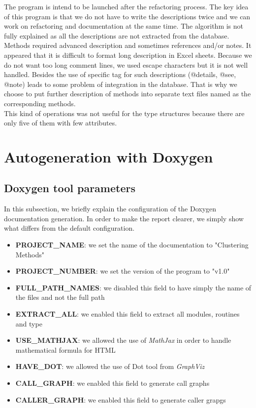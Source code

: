 The program is intend to be launched after the refactoring process. The key idea of this program is that we do not have to write the descriptions twice and we can work on refactoring and documentation at the same time. The algorithm is not fully explained as all the descriptions are not extracted from the database. Methods required advanced description and sometimes references and/or notes. It appeared that it is difficult to format long description in Excel sheets. Because we do not want too long comment lines, we used escape characters but it is not well handled.  Besides the use of specific tag for such descriptions (@details, @see, @note) leads to some problem of integration in the database. That is why we choose to put further description of methods into separate text files named as the corresponding methods.\\

This kind of operations was not useful for the type structures because there are only five of them with few attributes.
\section{Autogeneration with Doxygen}
\subsection{Doxygen tool parameters}
In this subsection, we briefly explain the configuration of the Doxygen documentation generation. In order to make the report clearer, we simply show what differs from the default configuration.
\begin{itemize}
\item \textbf{PROJECT\_NAME}: we set the name of the documentation to "Clustering Methods"
\item \textbf{PROJECT\_NUMBER}: we set the version of the program to "v1.0"
\item \textbf{FULL\_PATH\_NAMES}: we disabled this field to have simply the name of the files and not the full path
\item \textbf{EXTRACT\_ALL}: we enabled this field to extract all modules, routines and type
\item \textbf{USE\_MATHJAX}: we allowed the use of \textit{MathJax} in order to handle mathematical formula for HTML
\item \textbf{HAVE\_DOT}: we allowed the use of Dot tool from \textit{GraphViz}
\item \textbf{CALL\_GRAPH}: we enabled this field to generate call graphs
\item \textbf{CALLER\_GRAPH}: we enabled this field to generate caller grapgs
\end{itemize}
